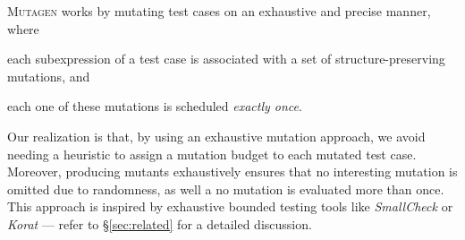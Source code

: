 \documentclass[sigconf,review,anonymous]{acmart}
\newcommand{\fuzzchick}{\textit{FuzzChick}\xspace}
\newcommand{\mutagen}{\textsc{Mutagen}\xspace}
\begin{document}
\mutagen works by mutating test cases on an exhaustive and precise manner, where
%
\begin{inparaenum}
  \item each subexpression of a test case is associated with a set of
    structure-preserving mutations, and
  \item each one of these mutations is scheduled \emph{exactly once}.
\end{inparaenum}
%
%
Our realization is that, by using an exhaustive mutation approach, we avoid
needing a heuristic to assign a mutation budget to each mutated test case.
%
Moreover, producing mutants exhaustively ensures that no interesting mutation is
omitted due to randomness, as well a no mutation is evaluated more than once.
%
This approach is inspired by exhaustive bounded testing tools like
\emph{SmallCheck} \cite{runciman2008smallcheck} or \emph{Korat}
\cite{boyapati2002korat} --- refer to \S \ref{sec:related} for a detailed
discussion.




\end{document}

